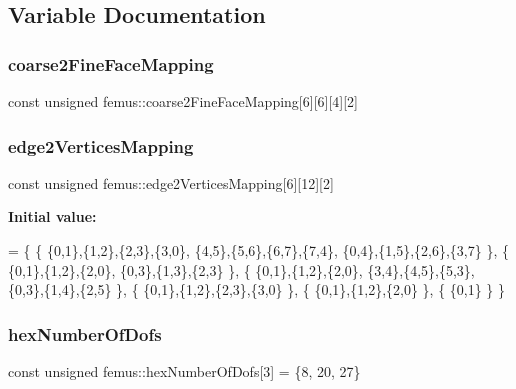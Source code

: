 \subsection{Variable Documentation}
\mbox{\label{namespacefemus_ace7b465b5a7044008102c88b1e0f9fec}} 
\subsubsection{\texorpdfstring{coarse2\+Fine\+Face\+Mapping}{coarse2FineFaceMapping}}
{\footnotesize\ttfamily const unsigned femus\+::coarse2\+Fine\+Face\+Mapping\mbox{[}6\mbox{]}\mbox{[}6\mbox{]}\mbox{[}4\mbox{]}\mbox{[}2\mbox{]}}

\mbox{\label{namespacefemus_ac4d5ff6eca33042e8b267a58ea3752bc}} 
\subsubsection{\texorpdfstring{edge2\+Vertices\+Mapping}{edge2VerticesMapping}}
{\footnotesize\ttfamily const unsigned femus\+::edge2\+Vertices\+Mapping\mbox{[}6\mbox{]}\mbox{[}12\mbox{]}\mbox{[}2\mbox{]}}

{\bfseries Initial value\+:}
\begin{DoxyCode}
= \{ 
    \{
      \{0,1\},\{1,2\},\{2,3\},\{3,0\},
      \{4,5\},\{5,6\},\{6,7\},\{7,4\},
      \{0,4\},\{1,5\},\{2,6\},\{3,7\}
    \},
    \{
      \{0,1\},\{1,2\},\{2,0\},
      \{0,3\},\{1,3\},\{2,3\}
    \},
    \{
      \{0,1\},\{1,2\},\{2,0\},
      \{3,4\},\{4,5\},\{5,3\},
      \{0,3\},\{1,4\},\{2,5\}
    \},
    \{
      \{0,1\},\{1,2\},\{2,3\},\{3,0\}
    \},
    \{
      \{0,1\},\{1,2\},\{2,0\}
    \},
    \{
      \{0,1\}
    \}
  \}
\end{DoxyCode}
\mbox{\label{namespacefemus_a5764d8d5cef480482021b6e071cc088d}} 
\subsubsection{\texorpdfstring{hex\+Number\+Of\+Dofs}{hexNumberOfDofs}}
{\footnotesize\ttfamily const unsigned femus\+::hex\+Number\+Of\+Dofs\mbox{[}3\mbox{]} = \{8, 20, 27\}}

